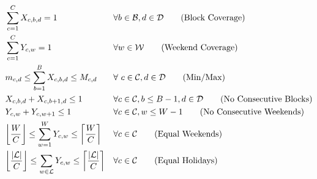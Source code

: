 \begin{align}
	&\sum_{c=1}^{C} X_{c, b, d} = 1 &&\forall b\in \mathcal{B}, d \in \mathcal{D} \tag{Block Coverage} \label{eqn:constr-block-cov} \\
	&\sum_{c=1}^{C} Y_{c, w} = 1 &&\forall w\in \mathcal{W} \tag{Weekend Coverage} \label{eqn:constr-weekend-cov} \\
	&m_{c, d} \leq \sum_{b=1}^{B} X_{c, b, d} \leq M_{c, d} &&\forall\ c\in\mathcal{C}, d\in\mathcal{D} \tag{Min/Max} \label{eqn:constr-min-max} \\
	&X_{c, b, d} + X_{c, b + 1, d} \leq 1 &&\forall c\in\mathcal{C}, b \leq B - 1, d\in\mathcal{D} \tag{No Consecutive Blocks} \label{eqn:constr-no-consec-blocks} \\
	&Y_{c, w} + Y_{c, w + 1} \leq 1 &&\forall c\in\mathcal{C}, w \leq W - 1 \tag{No Consecutive Weekends} \label{eqn:constr-no-consec-weekends} \\
	&\floor*{\frac{W}{C}} \leq \sum_{w=1}^W Y_{c, w} \leq \ceil*{\frac{W}{C}} &&\forall c\in\mathcal{C} \tag{Equal Weekends} \label{eqn:constr-equal-weekends} \\
	&\floor*{\frac{\abs{\mathcal{L}}}{C}} \leq \sum_{w\in\mathcal{L}} Y_{c, w} \leq \ceil*{\frac{\abs{\mathcal{L}}}{C}} &&\forall c\in\mathcal{C} \tag{Equal Holidays} \label{eqn:constr-equal-holidays}
\end{align}